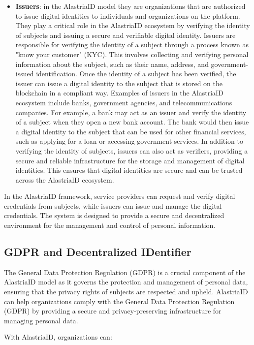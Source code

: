 \documentclass[target=mst,aauheader=]{thud}
\begin{document}
\begin{itemize}
    \item \textbf{Issuers}: in the AlastriaID model they are organizations that are authorized to issue digital identities to individuals and organizations on the platform. They play a critical role in the AlastriaID ecosystem by verifying the identity of subjects and issuing a secure and verifiable digital identity. Issuers are responsible for verifying the identity of a subject through a process known as "know your customer" (KYC). This involves collecting and verifying personal information about the subject, such as their name, address, and government-issued identification. Once the identity of a subject has been verified, the issuer can issue a digital identity to the subject that is stored on the blockchain in a compliant way.
        Examples of issuers in the AlastriaID ecosystem include banks, government agencies, and telecommunications companies. For example, a bank may act as an issuer and verify the identity of a subject when they open a new bank account. The bank would then issue a digital identity to the subject that can be used for other financial services, such as applying for a loan or accessing government services. In addition to verifying the identity of subjects, issuers can also act as verifiers, providing a secure and reliable infrastructure for the storage and management of digital identities. This ensures that digital identities are secure and can be trusted across the AlastriaID ecosystem.
        
\end{itemize}

In the AlastriaID framework, service providers can request and verify digital credentials from subjects, while issuers can issue and manage the digital credentials. The system is designed to provide a secure and decentralized environment for the management and control of personal information.

\subsection{GDPR and Decentralized IDentifier}
The General Data Protection Regulation (GDPR) is a crucial component of the AlastriaID model as it governs the protection and management of personal data, ensuring that the privacy rights of subjects are respected and upheld.
AlastriaID can help organizations comply with the General Data Protection Regulation (GDPR) by providing a secure and privacy-preserving infrastructure for managing personal data.\par
With AlastriaID, organizations can:
\end{document}
